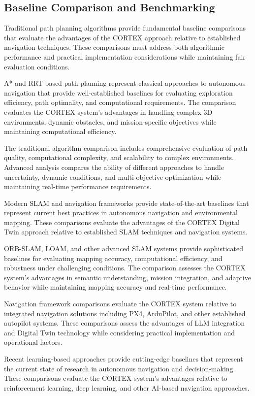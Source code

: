 \subsection{Baseline Comparison and Benchmarking}

Traditional path planning algorithms provide fundamental baseline comparisons that evaluate the advantages of the CORTEX approach relative to established navigation techniques. These comparisons must address both algorithmic performance and practical implementation considerations while maintaining fair evaluation conditions.

A* and RRT-based path planning represent classical approaches to autonomous navigation that provide well-established baselines for evaluating exploration efficiency, path optimality, and computational requirements. The comparison evaluates the CORTEX system's advantages in handling complex 3D environments, dynamic obstacles, and mission-specific objectives while maintaining computational efficiency.

The traditional algorithm comparison includes comprehensive evaluation of path quality, computational complexity, and scalability to complex environments. Advanced analysis compares the ability of different approaches to handle uncertainty, dynamic conditions, and multi-objective optimization while maintaining real-time performance requirements.

Modern SLAM and navigation frameworks provide state-of-the-art baselines that represent current best practices in autonomous navigation and environmental mapping. These comparisons evaluate the advantages of the CORTEX Digital Twin approach relative to established SLAM techniques and navigation systems.

ORB-SLAM, LOAM, and other advanced SLAM systems provide sophisticated baselines for evaluating mapping accuracy, computational efficiency, and robustness under challenging conditions. The comparison assesses the CORTEX system's advantages in semantic understanding, mission integration, and adaptive behavior while maintaining mapping accuracy and real-time performance.

Navigation framework comparisons evaluate the CORTEX system relative to integrated navigation solutions including PX4, ArduPilot, and other established autopilot systems. These comparisons assess the advantages of LLM integration and Digital Twin technology while considering practical implementation and operational factors.

Recent learning-based approaches provide cutting-edge baselines that represent the current state of research in autonomous navigation and decision-making. These comparisons evaluate the CORTEX system's advantages relative to reinforcement learning, deep learning, and other AI-based navigation approaches.

